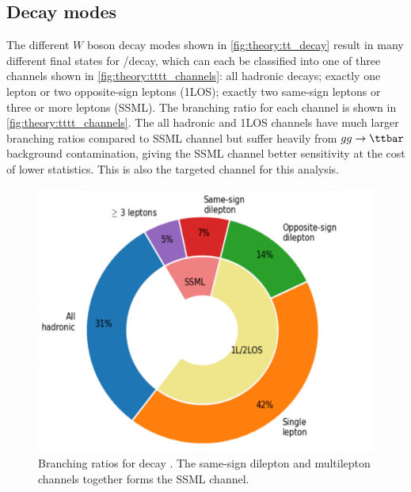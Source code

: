 \documentclass[../thesis.tex]{subfiles}
\begin{document}
\subsection{Decay modes}

The different $W$ boson decay modes shown in \autoref{fig:theory:tt_decay} result in many different final states for \ttZp/\tttt decay, which can each be classified into one of three channels shown in \autoref{fig:theory:tttt_channels}: all hadronic decays; exactly one lepton or two opposite-sign leptons (\acs{1LOS}); exactly two same-sign leptons or three or more leptons (\acs{SSML}). The branching ratio for each channel is shown in \autoref{fig:theory:tttt_channels}. The all hadronic and \acs{1LOS} channels have much larger branching ratios compared to \acs{SSML} channel but suffer heavily from $gg\rightarrow\ttbar$ background contamination, giving the \acs{SSML} channel better sensitivity at the cost of lower statistics. This is also the targeted channel for this analysis.

\begin{figure}[!t]
\centering
\includegraphics[width=0.7\linewidth]{fig/theory_tttt_channels.png}
\caption[Branching ratios for \tttt decay. The same-sign dilepton and multilepton channels together forms the SSML channel.]{\label{fig:theory:tttt_channels}Branching ratios for \tttt decay \citep{Sabatini:2784150}. The same-sign dilepton and multilepton channels together forms the \acs{SSML} channel.}
\end{figure}
\end{document}
